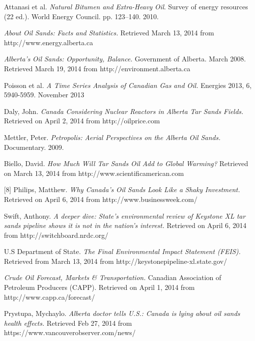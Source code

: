 \documentclass[11pt]{article}
\begin{document}
\newpage


\begin{thebibliography}{9}
 Attanasi et al.  \emph{Natural Bitumen and Extra-Heavy Oil}. Survey of energy resources (22 ed.). World Energy Council. pp. 123–140. 2010.

 \emph{About Oil Sands: Facts and Statistics.} Retrieved March 13, 2014 from
http://www.energy.alberta.ca

 \emph{Alberta's Oil Sands: Opportunity, Balance.} Government of Alberta. March 2008. Retrieved March 19, 2014 from http://environment.alberta.ca

Poisson et al.  \emph{A Time Series Analysis of Canadian Gas and Oil.} Energies 2013, 6, 5940-5959. November 2013

Daly, John.  \emph{Canada Considering Nuclear Reactors in Alberta Tar Sands Fields.} Retrieved on April 2, 2014 from http://oilprice.com 

Mettler, Peter.  \emph{Petropolis: Aerial Perspectives on the Alberta Oil Sands.}
Documentary. 2009.

Biello, David.  \emph{How Much Will Tar Sands Oil Add to Global Warming?} Retrieved on March 13, 2014 from http://www.scientificamerican.com

[8] Philips, Matthew.  \emph{Why Canada’s Oil Sands Look Like a Shaky Investment.} Retrieved on April 6, 2014 from http://www.businessweek.com/ 

Swift, Anthony.  \emph{A deeper dive: State’s environmental review of Keystone XL tar sands pipeline shows it is not in the nation’s interest.} Retrieved on April 6, 2014 from http://switchboard.nrdc.org/ 

U.S Department of State.  \emph{The Final Environmental Impact Statement (FEIS).} Retrieved from March 13, 2014 from http://keystonepipeline-xl.state.gov/

 \emph{Crude Oil Forecast, Markets \& Transportation.} Canadian Association of Petroleum Producers (CAPP). Retrieved on April 1, 2014 from http://www.capp.ca/forecast/

Prystupa, Mychaylo.  \emph{Alberta doctor tells U.S.: Canada is lying about oil sands health effects.} Retrieved Feb 27, 2014 from https://www.vancouverobserver.com/news/


\end{thebibliography}
\end{document}
